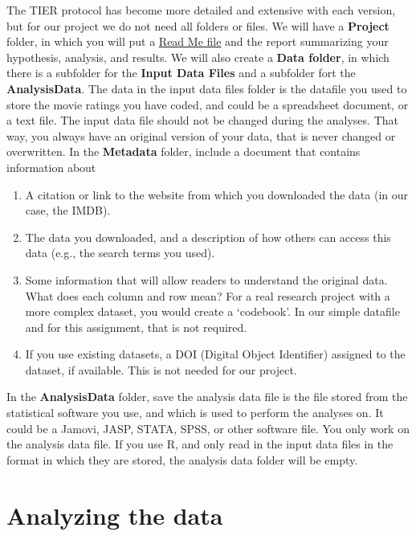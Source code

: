 \documentclass[
  oneside]{book}
\begin{document}
The TIER protocol has become more detailed and extensive with each version, but for our project we do not need all folders or files. We will have a \textbf{Project} folder, in which you will put a \href{https://www.projecttier.org/tier-protocol/protocol-4-0/root/readme/}{Read Me file} and the report summarizing your hypothesis, analysis, and results. We will also create a \textbf{Data folder}, in which there is a subfolder for the \textbf{Input Data Files} and a subfolder fort the \textbf{AnalysisData}. The data in the input data files folder is the datafile you used to store the movie ratings you have coded, and could be a spreadsheet document, or a text file. The input data file should not be changed during the analyses. That way, you always have an original version of your data, that is never changed or overwritten. In the \textbf{Metadata} folder, include a document that contains information about

\begin{enumerate}
\def\labelenumi{\arabic{enumi}.}
\item
  A citation or link to the website from which you downloaded the data (in our case, the IMDB).
\item
  The data you downloaded, and a description of how others can access this data (e.g., the search terms you used).
\item
  Some information that will allow readers to understand the original data. What does each column and row mean? For a real research project with a more complex dataset, you would create a `codebook'. In our simple datafile and for this assignment, that is not required.
\item
  If you use existing datasets, a DOI (Digital Object Identifier) assigned to the dataset, if available. This is not needed for our project.
\end{enumerate}

In the \textbf{AnalysisData} folder, save the analysis data file is the file stored from the statistical software you use, and which is used to perform the analyses on. It could be a Jamovi, JASP, STATA, SPSS, or other software file. You only work on the analysis data file. If you use R, and only read in the input data files in the format in which they are stored, the analysis data folder will be empty.

\hypertarget{analyzing-the-data}{%
\section{Analyzing the data}\label{analyzing-the-data}}
\end{document}
